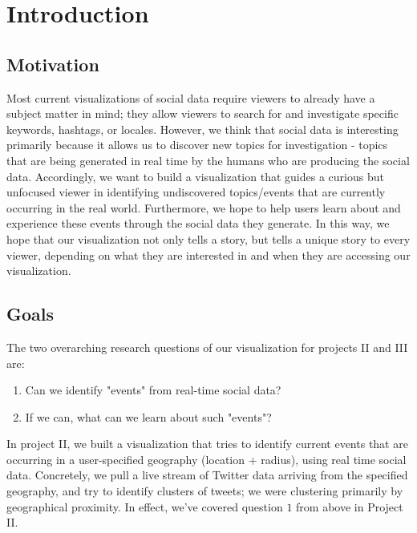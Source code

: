 \documentclass[pdftex,12pt,a4paper]{article}
\begin{document}

\tableofcontents
\pagebreak

\section{Introduction}
\subsection{Motivation}
Most current visualizations of social data require viewers to already have a subject matter in mind; they allow viewers to search for and investigate specific keywords, hashtags, or locales. However, we think that social data is interesting primarily because it allows us to discover new topics for investigation - topics that are being generated in real time by the humans who are producing the social data. Accordingly, we want to build a visualization that guides a curious but unfocused viewer in identifying undiscovered topics/events that are currently occurring in the real world. Furthermore, we hope to help users learn about and experience these events through the social data they generate. In this way, we hope that our visualization not only tells a story, but tells a unique story to every viewer, depending on what they are interested in and when they are accessing our visualization. 


\subsection{Goals}
The two overarching research questions of our visualization for projects II and III are:
\begin{enumerate}
\item Can we identify "events" from real-time social data?
\item If we can, what can we learn about such "events"?
\end{enumerate}
In project II, we built a visualization that tries to identify current events that are occurring in a user-specified geography (location + radius), using real time social data. Concretely, we pull a live stream of Twitter data arriving from the specified geography, and try to identify clusters of tweets; we were clustering primarily by geographical proximity. In effect, we've covered question $1$ from above in Project II.
\end{document}
